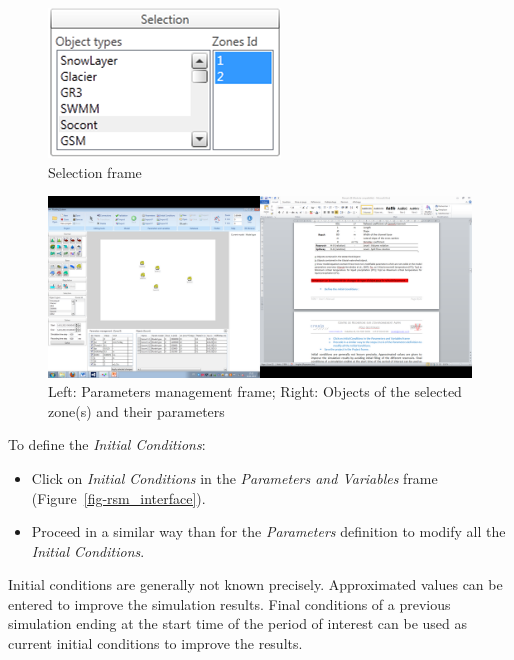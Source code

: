 \documentclass[
  letterpaper,
  DIV=11,
  numbers=noendperiod]{scrreprt}
\begin{document}
\begin{figure}

{\centering \includegraphics{./figures/fig-selection_frame.png}

}

\caption{\label{fig-selection_frame}Selection frame}

\end{figure}

\begin{figure}

{\centering \includegraphics{./figures/fig-param_management_frame.png}

}

\caption{\label{fig-param_management_frame}Left: Parameters management
frame; Right: Objects of the selected zone(s) and their parameters}

\end{figure}

To define the \emph{Initial Conditions}:

\begin{itemize}
\item
  {Click on \emph{Initial Conditions} in the \emph{Parameters and
  Variables} frame (Figure~\ref{fig-rsm_interface}).}
\item
  {Proceed in a similar way than for the \emph{Parameters} definition to
  modify all the \emph{Initial Conditions}.}
\end{itemize}

Initial conditions are generally not known precisely. Approximated
values can be entered to improve the simulation results. Final
conditions of a previous simulation ending at the start time of the
period of interest can be used as current initial conditions to improve
the results.
\end{document}
